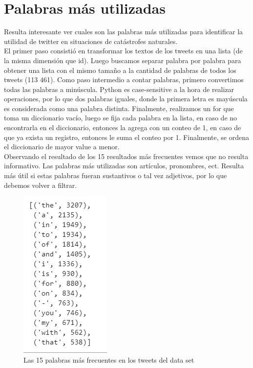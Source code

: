 \documentclass[]{article}
\begin{document}
\section{Palabras m\'as utilizadas}
Resulta interesante ver cuales son las palabras m\'as utilizadas para identificar la utilidad de twitter en situaciones de cat\'astrofes naturales.\\

El primer paso consisti\'o en transformar los textos de los tweets en una lista (de la misma dimensi\'on que id). Luego buscamos separar palabra por palabra para obtener una lista con el mismo tamaño a la cantidad de palabras de todos los tweets (113 461). Como paso intermedio a contar palabras, primero convertimos todas las palabras a min\'uscula. Python es case-sensitive a la hora de realizar operaciones, por lo que dos palabras iguales, donde la primera letra es may\'uscula es considerada como una palabra distinta. Finalmente, realizamos un for que toma un diccionario vac\'io, luego se fija cada palabra en la lista, en caso de no encontrarla en el diccionario, entonces la agrega con un conteo de 1, en caso de que ya exista un registro, entonces le suma el conteo por 1. Finalmente, se ordena el diccionario de mayor value a menor. \\

Observando el resultado de los 15 resultados m\'as frecuentes vemos que no resulta informativo. Las palabras m\'as utilizadas son art\'iculos, pronombres, ect. Resulta m\'as \'util si estas palabras fueran sustantivos o tal vez adjetivos, por lo que debemos volver a filtrar. \\  

 \begin{figure}[H]
	\centering
	\includegraphics[width=0.35\linewidth]{tweet_token}
	\caption[]{Las 15 palabras m\'as frecuentes en los tweets del data set}
\end{figure}
\end{document}
